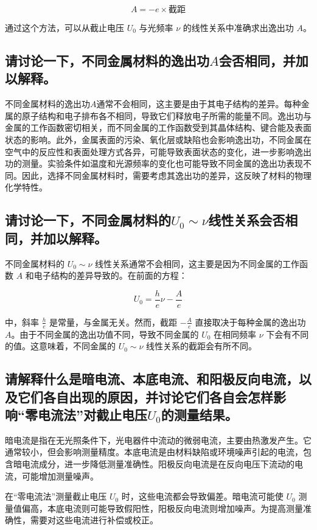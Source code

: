 \documentclass{ctexart}
\begin{document}
$$ A = -e \times \text{截距} $$

通过这个方法，可以从截止电压 \( U_0 \) 与光频率 \( \nu \) 的线性关系中准确求出逸出功 \( A \)。

\subsection{请讨论一下，不同金属材料的逸出功$A$会否相同，并加以解释。}

不同金属材料的逸出功$A$通常不会相同，这主要是由于其电子结构的差异。每种金属的原子结构和电子排布各不相同，导致它们释放电子所需的能量不同。逸出功与金属的工作函数密切相关，而不同金属的工作函数受到其晶体结构、键合能及表面状态的影响。此外，金属表面的污染、氧化层或缺陷也会影响逸出功，不同金属在空气中的反应性和表面处理方式各异，可能导致表面状态的变化，进一步影响逸出功的测量。实验条件如温度和光源频率的变化也可能导致不同金属的逸出功表现不同。因此，选择不同金属材料时，需要考虑其逸出功的差异，这反映了材料的物理化学特性。

\subsection{请讨论一下，不同金属材料的$U_0 \sim \nu$线性关系会否相同，并加以解释。}

不同金属材料的 $U_0 \sim \nu$ 线性关系通常不会相同，这主要是因为不同金属的工作函数 $A$ 和电子结构的差异导致的。在前面的方程：

$$ U_0 = \frac{h}{e}\nu - \frac{A}{e} $$

\noindent 中，斜率 $\frac{h}{e}$ 是常量，与金属无关。然而，截距 $-\frac{A}{e}$ 直接取决于每种金属的逸出功 $A$。由于不同金属的逸出功值不同，导致不同金属的 $U_0$ 在相同频率 $\nu$ 下会有不同的值。这意味着，不同金属的 $U_0 \sim \nu$ 线性关系的截距会有所不同。

\subsection{请解释什么是暗电流、本底电流、和阳极反向电流，以及它们各自出现的原因，并讨论它们各自会怎样影响“零电流法”对截止电压$U_0$的测量结果。}

暗电流是指在无光照条件下，光电器件中流动的微弱电流，主要由热激发产生。它通常较小，但会影响测量精度。本底电流是由材料缺陷或环境噪声引起的电流，包含暗电流成分，进一步降低测量准确性。阳极反向电流是在反向电压下流动的电流，可能增加测量噪声。

在“零电流法”测量截止电压 $U_0$ 时，这些电流都会导致偏差。暗电流可能使 $U_0$ 测量值偏高，本底电流则可能导致假阳性，阳极反向电流则增加噪声。为提高测量准确性，需要对这些电流进行补偿或校正。
\end{document}
